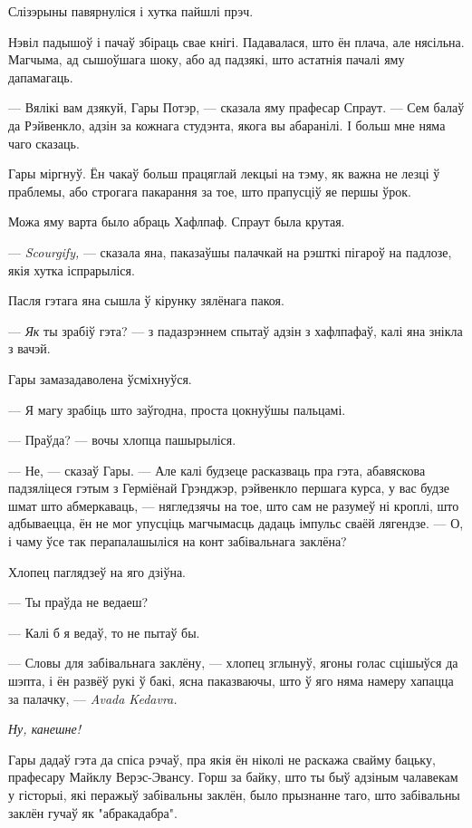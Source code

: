 Слізэрыны павярнуліся і хутка пайшлі прэч.

Нэвіл падышоў і пачаў збіраць свае кнігі. Падавалася, што ён плача, але нясільна.
Магчыма, ад сышоўшага шоку, або ад падзякі, што астатнія пачалі яму дапамагаць.

--- Вялікі вам дзякуй, Гары Потэр, --- сказала яму прафесар Спраут. --- Сем 
балаў да Рэйвенкло, адзін за кожнага студэнта, якога вы абаранілі. І больш мне няма 
чаго сказаць.

Гары міргнуў. Ён чакаў больш працяглай лекцыі на тэму, як важна не лезці ў праблемы,
або строгага пакарання за тое, што прапусціў яе першы ўрок. 

Можа яму варта было абраць Хафлпаф. Спраут была крутая.

--- \emph{Scourgify,} --- сказала яна, паказаўшы палачкай на рэшткі пігароў на падлозе,
якія хутка іспрарыліся.

Пасля гэтага яна сышла ў кірунку зялёнага пакоя.

--- \emph{Як} ты зрабіў гэта? --- з падазрэннем спытаў адзін з хафлпафаў, калі яна знікла з вачэй.

Гары замазадаволена ўсміхнуўся.

--- Я магу зрабіць што заўгодна, проста цокнуўшы пальцамі.


--- Праўда? --- вочы хлопца пашырыліся.

--- Не, --- сказаў Гары. --- Але калі будзеце расказваць пра гэта, абавяскова 
падзяліцеся гэтым з Герміёнай Грэнджэр, рэйвенкло першага курса, у вас будзе шмат 
што абмеркаваць, --- нягледзячы на тое, што сам не разумеў ні кроплі, што адбываецца,
ён не мог упусціць магчымасць дадаць імпульс сваёй лягендзе. --- О, і 
чаму ўсе так перапалашыліся на конт забівальнага заклёна?

Хлопец паглядзеў на яго дзіўна.

--- Ты праўда не ведаеш?

--- Калі б я ведаў, то не пытаў бы.

--- Словы для забівальнага заклёну, --- хлопец зглынуў, ягоны голас сцішыўся да шэпта, 
і ён развёў рукі ў бакі, ясна паказваючы, што ў яго няма намеру хапацца за палачку, --- 
\emph{Avada Kedavra.}

\emph{Ну, канешне!}

Гары дадаў гэта да спіса рэчаў, пра якія ён ніколі не раскажа свайму бацьку, прафесару
Майклу Верэс-Эвансу. Горш за байку, што ты быў адзіным чалавекам у гісторыі, які перажыў
забівальны заклён, было прызнанне таго, што забівальны заклён гучаў як "абракадабра".

